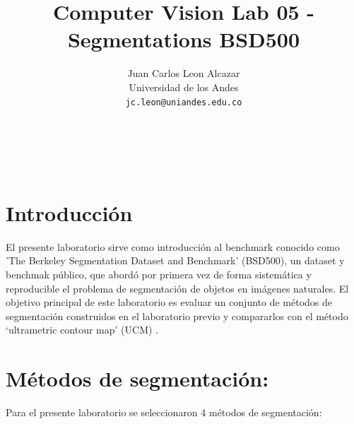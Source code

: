 \documentclass[10pt,twocolumn,letterpaper]{article}
\begin{document}
\title{Computer Vision Lab 05 -Segmentations BSD500}

\author{Juan Carlos Leon Alcazar\\
Universidad de los Andes\\
{\tt\small jc.leon@uniandes.edu.co}
\and
\\
\\
\\
{\tt\small }
}

\maketitle



\section{Introducción}
El presente laboratorio sirve como introducción al benchmark conocido como 'The Berkeley Segmentation Dataset and Benchmark' (BSD500), un dataset y benchmak público, que abordó por primera vez de forma sistemática y reproducible el problema de segmentación de objetos en imágenes naturales. El objetivo principal de este laboratorio es evaluar un conjunto de métodos de segmentación construidos en el laboratorio previo y compararlos con el método ‘ultrametric contour map’ (UCM) \cite{Arbelaez2009}.

\section{Métodos de segmentación:}
Para  el presente laboratorio se seleccionaron 4 métodos de segmentación:
\end{document}
